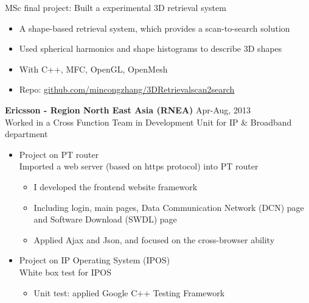 \documentclass[line,margin]{res}
\begin{document}
\begin{resume}
MSc final project: Built a experimental 3D retrieval system
\begin{itemize}\itemsep -2pt %
    \item A shape-based retrieval system, which provides a scan-to-search solution
    \item Used spherical harmonics and shape histograms to describe 3D shapes
    \item With C++, MFC, OpenGL, OpenMesh
    \item Repo: \href{https://github.com/mincongzhang/3D\textunderscore Retrieval\textunderscore scan2search}{github.com/mincongzhang/3D\textunderscore  Retrieval\textunderscore scan2search}
\end{itemize}

\renewcommand{\labelitemi}{$\bullet$}
\renewcommand{\labelitemii}{-}

{\bf Ericsson - Region North East Asia (RNEA)}
\hfill{\textcolor[rgb]{0.7,0.7,0.7}{Apr-Aug, 2013}}\\
Worked in a Cross Function Team in Development Unit for IP \& Broadband department

\begin{itemize}
\itemsep -2pt %

    \item Project on PT router\\
    Imported a web server (based on https protocol) into PT router\vspace{-6pt}
    \begin{itemize} \itemsep -2pt
        \item I developed the frontend website framework
        \item Including login, main pages, Data Communication Network (DCN) page and Software Download (SWDL) page
        \item Applied Ajax and Json, and focused on the cross-browser ability
    \end{itemize}
    
    \item Project on IP Operating System (IPOS)\\
    White box test for IPOS\vspace{-6pt}
    \begin{itemize}\itemsep -2pt %
        \item Unit test: applied Google C++ Testing Framework
    \end{itemize}
    

\end{itemize}
\end{resume}
\end{document}
